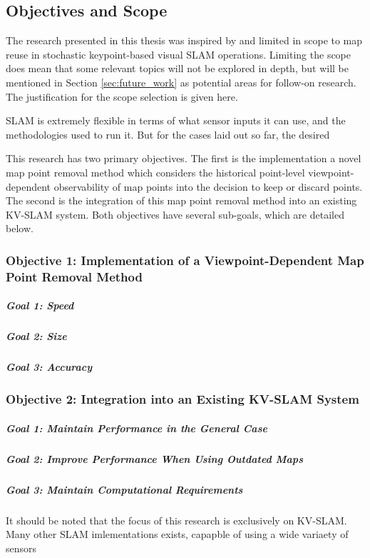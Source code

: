 \subsection{Objectives and Scope}
\label{objectives}

The research presented in this thesis was inspired by and limited in scope to map reuse in stochastic keypoint-based visual SLAM operations. Limiting the scope does mean that some relevant topics will not be explored in depth, but will be mentioned in Section \ref{sec:future_work} as potential areas for follow-on research. The justification for the scope selection is given here.

SLAM is extremely flexible in terms of what sensor inputs it can use, and the methodologies used to run it. But for the cases laid out so far, the desired 

This research has two primary objectives. The first is the implementation a novel map point removal method which considers the historical point-level viewpoint-dependent observability of map points into the decision to keep or discard points. The second is the integration of this map point removal method into an existing KV-SLAM system. Both objectives have several sub-goals, which are detailed below.

\subsubsection*{Objective 1: Implementation of a Viewpoint-Dependent Map Point Removal Method}

\subparagraph{Goal 1: Speed}
\subparagraph{Goal 2: Size}
\subparagraph{Goal 3: Accuracy}

\subsubsection*{Objective 2: Integration into an Existing KV-SLAM System}

\subparagraph{Goal 1: Maintain Performance in the General Case}
\subparagraph{Goal 2: Improve Performance When Using Outdated Maps}
\subparagraph{Goal 3: Maintain Computational Requirements}



It should be noted that the focus of this research is exclusively on KV-SLAM. Many other SLAM imlementations exists, capapble of using a wide variaety of sensors


